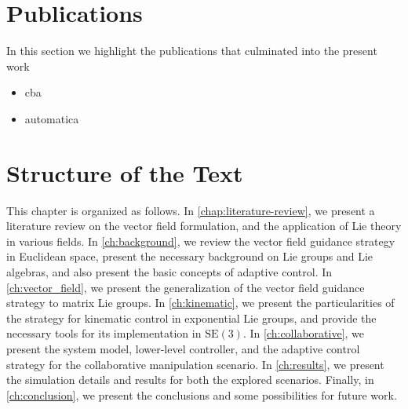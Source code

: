 \section{Publications}
In this section we highlight the publications that culminated into the present work
\begin{itemize}
    \item cba
    \item automatica
\end{itemize}
\section{Structure of the Text}
This chapter is organized as follows. In \cref{chap:literature-review}, we present a literature review on the vector field formulation, and the application of Lie theory in various fields. In \cref{ch:background}, we review the vector field guidance strategy in Euclidean space, present the necessary background on Lie groups and Lie algebras, and also present the basic concepts of adaptive control. In \cref{ch:vector_field}, we present the generalization of the vector field guidance strategy to matrix Lie groups. In \cref{ch:kinematic}, we present the particularities of the strategy for kinematic control in exponential Lie groups, and provide the necessary tools for its implementation in $\text{SE}(3)$. In \cref{ch:collaborative}, we present the system model, lower-level controller, and the adaptive control strategy for the collaborative manipulation scenario. In \cref{ch:results}, we present the simulation details and results for both the explored scenarios. Finally, in \cref{ch:conclusion}, we present the conclusions and some possibilities for future work.

